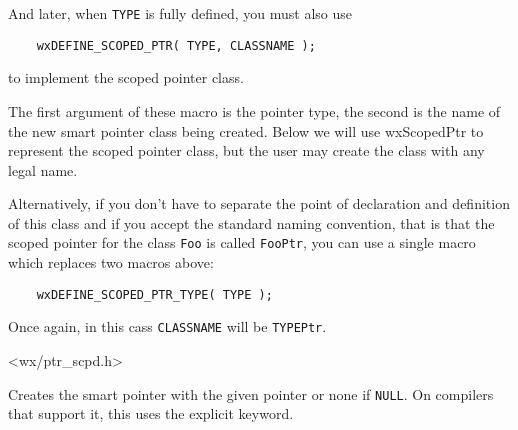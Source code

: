 And later, when \texttt{TYPE} is fully defined, you must also use
\begin{verbatim}
    wxDEFINE_SCOPED_PTR( TYPE, CLASSNAME );
\end{verbatim}
to implement the scoped pointer class.

The first argument of these macro is the pointer type, the second is the name
of the new smart pointer class being created.  Below we will use wxScopedPtr to
represent the scoped pointer class, but the user may create the class with any
legal name.

Alternatively, if you don't have to separate the point of declaration and
definition of this class and if you accept the standard naming convention, that
is that the scoped pointer for the class \texttt{Foo} is called 
\texttt{FooPtr}, you can use a single macro which replaces two macros above:
\begin{verbatim}
    wxDEFINE_SCOPED_PTR_TYPE( TYPE );
\end{verbatim}
Once again, in this cass \texttt{CLASSNAME} will be \texttt{TYPEPtr}.


<wx/ptr\_scpd.h>


\rtfsp




Creates the smart pointer with the given pointer or none if {\tt NULL}.  On
compilers that support it, this uses the explicit keyword.


